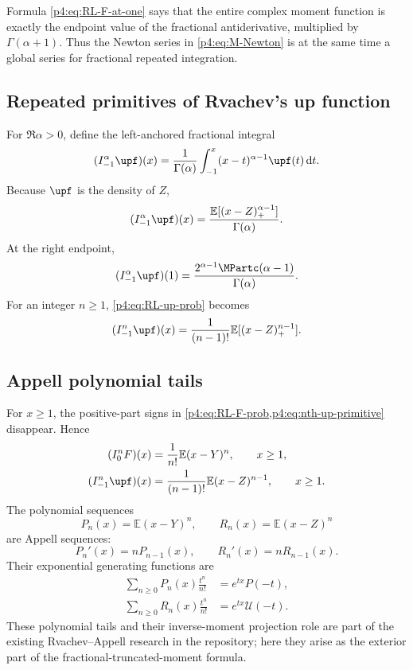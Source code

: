 \documentclass[11pt,oneside]{article}
\theoremstyle{definition}
\theoremstyle{remark}
\newcommand{\F}{F}
\newcommand{\E}{\mathbb E}
\newcommand{\dd}{\,\mathrm d}
\newcommand{\1}{\mathbf 1}
\begin{document}
Formula \cref{p4:eq:RL-F-at-one} says that the entire complex moment function is exactly
the endpoint value of the fractional antiderivative, multiplied by
\(\Gamma(\alpha+1)\).  Thus the Newton series in \cref{p4:eq:M-Newton} is at the same
time a global series for fractional repeated integration.

\subsection{Repeated primitives of Rvachev's up function}

For \(\Re\alpha>0\), define the left-anchored fractional integral
\begin{equation}\label{p4:eq:RL-up-def}
 (I_{-1}^\alpha\upf)(x)
 =\frac1{\Gamma(\alpha)}\int_{-1}^x(x-t)^{\alpha-1}\upf(t)\dd t.
\end{equation}
Because \(\upf\) is the density of \(Z\),
\begin{equation}\label{p4:eq:RL-up-prob}
 (I_{-1}^\alpha\upf)(x)
 =\frac{\E[(x-Z)_+^{\alpha-1}]}{\Gamma(\alpha)}.
\end{equation}
At the right endpoint,
\begin{equation}\label{p4:eq:RL-up-at-one}
 (I_{-1}^\alpha\upf)(1)
 =\frac{2^{\alpha-1}\MPartc(\alpha-1)}{\Gamma(\alpha)}.
\end{equation}
For an integer \(n\ge1\), \cref{p4:eq:RL-up-prob} becomes
\begin{equation}\label{p4:eq:nth-up-primitive}
 (I_{-1}^n\upf)(x)
 =\frac1{(n-1)!}\E[(x-Z)_+^{n-1}].
\end{equation}

\subsection{Appell polynomial tails}

For \(x\ge1\), the positive-part signs in \cref{p4:eq:RL-F-prob,p4:eq:nth-up-primitive}
disappear.  Hence
\begin{align}
 (I_0^n\F)(x)&=\frac1{n!}\E(x-Y)^n,\qquad x\ge1,
 \label{p4:eq:F-Appell-tail}\\
 (I_{-1}^n\upf)(x)&=\frac1{(n-1)!}\E(x-Z)^{n-1},\qquad x\ge1.
 \label{p4:eq:up-Appell-tail}
\end{align}
The polynomial sequences
\begin{equation}\label{p4:eq:Appell-polynomials}
 P_n(x)=\E(x-Y)^n,
 \qquad R_n(x)=\E(x-Z)^n
\end{equation}
are Appell sequences:
\begin{equation}\label{p4:eq:Appell-derivative}
 P_n'(x)=nP_{n-1}(x),\qquad R_n'(x)=nR_{n-1}(x).
\end{equation}
Their exponential generating functions are
\begin{align}
 \sum_{n\ge0}P_n(x)\frac{t^n}{n!}
 &=e^{tx}P(-t),\label{p4:eq:Pn-egf}\\
 \sum_{n\ge0}R_n(x)\frac{t^n}{n!}
 &=e^{tx}\mathcal U(-t).\label{p4:eq:Rn-egf}
\end{align}
These polynomial tails and their inverse-moment projection role are part of the existing
Rvachev--Appell research in the repository; here they arise as the exterior part of the
fractional-truncated-moment formula.
\end{document}
